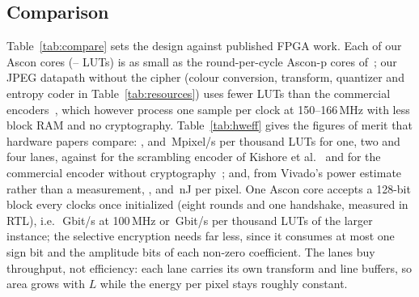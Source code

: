 


\subsection{Comparison}
Table~\ref{tab:compare} sets the design against published FPGA work. Each of our Ascon cores (\AsconLutMin--\AsconLutMax{} LUTs) is as small as the round-per-cycle Ascon-p cores of~\cite{khairallah2023}; our JPEG datapath without the cipher (colour conversion, transform, quantizer and entropy coder in Table~\ref{tab:resources}) uses fewer LUTs than the commercial encoders~\cite{logijpge,castjpeg}, which however process one sample per clock at 150--166\,MHz with less block RAM and no cryptography. Table~\ref{tab:hweff} gives the figures of merit that hardware papers compare: \HeTopPerKlut, \HeTwoPerKlut{} and \HeFourPerKlut\,Mpixel/s per thousand LUTs for one, two and four lanes, against \HeKishorePerKlut{} for the scrambling encoder of Kishore et al.~\cite{kishore2015} and \HeLogiPerKlut{} for the commercial encoder without cryptography~\cite{logijpge}; and, from Vivado's power estimate rather than a measurement, \HeTopNj, \HeTwoNj{} and \HeFourNj\,nJ per pixel. One Ascon core accepts a 128-bit block every \AsconCyclesPerBlock{} clocks once initialized (eight rounds and one handshake, measured in RTL), i.e.\ \AsconGbps\,Gbit/s at 100\,MHz or \AsconGbpsPerKlut\,Gbit/s per thousand LUTs of the larger instance; the selective encryption needs far less, since it consumes at most one sign bit and the amplitude bits of each non-zero coefficient. The lanes buy throughput, not efficiency: each lane carries its own transform and line buffers, so area grows with $L$ while the energy per pixel stays roughly constant.

